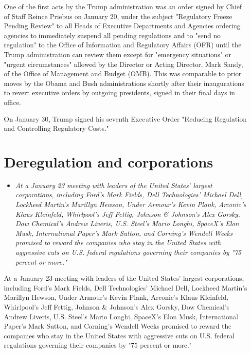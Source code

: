 One of the first acts by the Trump administration was an order signed by
Chief of Staff Reince Priebus on January 20, under the subject
"Regulatory Freeze Pending Review" to all Heads of Executive Departments
and Agencies ordering agencies to immediately suspend all pending
regulations and to "send no regulation" to the Office of Information and
Regulatory Affairs (OFR) until the Trump administration can review them
except for "emergency situations" or "urgent circumstances" allowed by
the Director or Acting Director, Mark Sandy, of the Office of Management
and Budget (OMB). This was comparable to prior moves by the Obama and
Bush administrations shortly after their inaugurations to revert
executive orders by outgoing presidents, signed in their final days in
office.

On January 30, Trump signed his seventh Executive Order "Reducing
Regulation and Controlling Regulatory Costs."

\section{Deregulation and
corporations}\label{deregulation-and-corporations}

\begin{itemize}
\item
  \emph{At a January 23 meeting with leaders of the United States'
  largest corporations, including Ford's Mark Fields, Dell Technologies'
  Michael Dell, Lockheed Martin's Marillyn Hewson, Under Armour's Kevin
  Plank, Arconic's Klaus Kleinfeld, Whirlpool's Jeff Fettig, Johnson \&
  Johnson's Alex Gorsky, Dow Chemical's Andrew Liveris, U.S. Steel's
  Mario Longhi, SpaceX's Elon Musk, International Paper's Mark Sutton,
  and Corning's Wendell Weeks promised to reward the companies who stay
  in the United States with aggressive cuts on U.S. federal regulations
  governing their companies by "75 percent or more."}
\end{itemize}

At a January 23 meeting with leaders of the United States' largest
corporations, including Ford's Mark Fields, Dell Technologies' Michael
Dell, Lockheed Martin's Marillyn Hewson, Under Armour's Kevin Plank,
Arconic's Klaus Kleinfeld, Whirlpool's Jeff Fettig, Johnson \& Johnson's
Alex Gorsky, Dow Chemical's Andrew Liveris, U.S. Steel's Mario Longhi,
SpaceX's Elon Musk, International Paper's Mark Sutton, and Corning's
Wendell Weeks promised to reward the companies who stay in the United
States with aggressive cuts on U.S. federal regulations governing their
companies by "75 percent or more."

